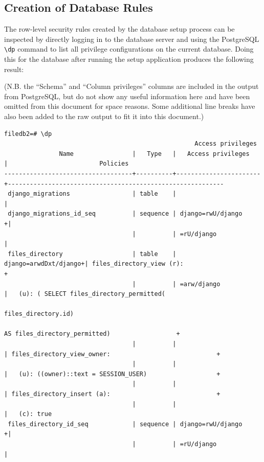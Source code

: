 \documentclass[12pt]{report}
\begin{document}
\begin{landscape}
  \section{Creation of Database Rules}
  The row-level security rules created by the database setup process can be inspected by directly logging in to the database server and using the PostgreSQL \verb+\dp+ command to list all privilege configurations on the current database. Doing this for the database after running the setup application produces the following result:

  (N.B. the ``Schema'' and ``Column privileges'' columns are included in the output from PostgreSQL, but do not show any useful information here and have been omitted from this document for space reasons. Some additional line breaks have also been added to the raw output to fit it into this document.)
  {\footnotesize
\begin{verbatim}
filedb2=# \dp
                                                    Access privileges
               Name                |   Type   |   Access privileges   |                         Policies
-----------------------------------+----------+-----------------------+-----------------------------------------------------------
 django_migrations                 | table    |                       |
 django_migrations_id_seq          | sequence | django=rwU/django    +|
                                   |          | =rU/django            |
 files_directory                   | table    | django=arwdDxt/django+| files_directory_view (r):                               +
                                   |          | =arw/django           |   (u): ( SELECT files_directory_permitted(
                                                                                 files_directory.id)
                                                                                 AS files_directory_permitted)                  +
                                   |          |                       | files_directory_view_owner:                             +
                                   |          |                       |   (u): ((owner)::text = SESSION_USER)                   +
                                   |          |                       | files_directory_insert (a):                             +
                                   |          |                       |   (c): true
 files_directory_id_seq            | sequence | django=rwU/django    +|
                                   |          | =rU/django            |

\end{verbatim}}
\end{landscape}
\end{document}
